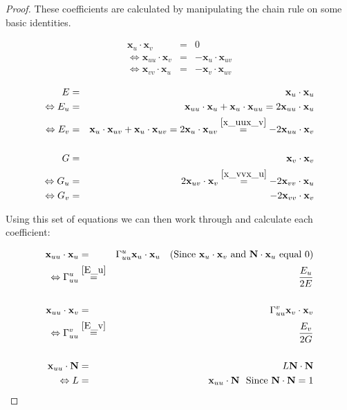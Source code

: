 \begin{proof}
These coefficients are calculated by manipulating the chain rule on some basic identities.

\begin{eqnarray}
\nonumber
\mathbf x_u \cdot \mathbf x_v &=& 0 \\
\Leftrightarrow \mathbf x_{uu} \cdot \mathbf x_v &=& - \mathbf x_u \cdot \mathbf x_{uv} 
\label{x_uux_v} \\
\Leftrightarrow \mathbf x_{vv} \cdot \mathbf x_{u} &=& -\mathbf x_v \cdot \mathbf x_{uv}
\label{x_vvx_u}
\end{eqnarray}

\begin{eqnarray}
\nonumber
E &=& \mathbf x_u \cdot \mathbf x_u \\
\Leftrightarrow E_u &=& \mathbf x_{uu} \cdot \mathbf x_u + \mathbf x_u \cdot \mathbf x_{uu} = 2 \mathbf x_{uu} \cdot \mathbf x_u
\label{E_u} \\
\Leftrightarrow E_v &=& \mathbf x_{u} \cdot \mathbf x_{uv} + \mathbf x_u \cdot \mathbf x_{uv} = 2 \mathbf x_{u} \cdot \mathbf x_{uv} \stackrel{\ref{x_uux_v}}{=} -2 \mathbf x_{uu} \cdot \mathbf x_v
\label{E_v} \\
\nonumber
&\ & \\
\nonumber
G &=& \mathbf x_v \cdot \mathbf x_v \\
\Leftrightarrow G_u &=& 2 \mathbf x_{uv} \cdot \mathbf x_v \stackrel{\ref{x_vvx_u}}{=} - 2 \mathbf x_{vv} \cdot \mathbf x_{u}
\label{G_u} \\
\Leftrightarrow G_v &=& -2 \mathbf x_{vv} \cdot \mathbf x_v
\label{G_v}
\end{eqnarray}

Using this set of equations we can then work through and calculate each coefficient:

\begin{eqnarray}
\nonumber
\mathbf x_{uu} \cdot \mathbf x_u &=& \Gamma^u_{uu} \mathbf x_u \cdot \mathbf x_u \ \ \ \mbox{(Since $\mathbf x_u \cdot \mathbf x_v$ and $\mathbf N \cdot \mathbf x_u$ equal $0$)}
\\
\nonumber
\Leftrightarrow \Gamma^u_{uu} &\stackrel{\ref{E_u}}{=}& \frac{E_u}{2E}
\\
\nonumber
&\ & \\
\nonumber
\mathbf x_{uu} \cdot \mathbf x_v &=& \Gamma^v_{uu} \mathbf x_v \cdot \mathbf x_v 
\\
\nonumber
\Leftrightarrow \Gamma^v_{uu} &\stackrel{\ref{E_v}}{=}& \frac{E_v}{2G}
\\
\nonumber
&\ & \\
\nonumber
\mathbf x_{uu} \cdot \mathbf N &=& L \mathbf N \cdot \mathbf N
\\
\nonumber
\Leftrightarrow L &=& \mathbf x_{uu} \cdot \mathbf N  \ \ \mbox{Since $\mathbf N \cdot \mathbf N = 1$}
\end{eqnarray}


\end{proof}
